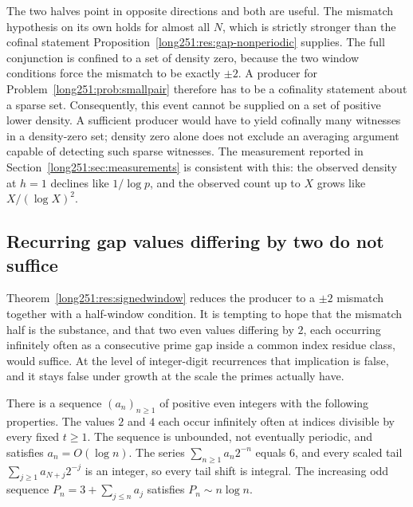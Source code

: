\documentclass[11pt]{article}
\begin{document}
The two halves point in opposite directions and both are useful.  The mismatch
hypothesis on its own holds for almost all $N$, which is strictly stronger than
the cofinal statement Proposition~\ref{long251:res:gap-nonperiodic} supplies.  The full
conjunction is confined to a set of density zero, because the two window
conditions force the mismatch to be exactly $\pm2$.  A producer for
Problem~\ref{long251:prob:smallpair} therefore has to be a cofinality statement about
a sparse set.  Consequently, this event cannot be supplied on a set of positive
lower density.  A sufficient producer would have to yield cofinally many
witnesses in a density-zero set; density zero alone does not exclude an
averaging argument capable of detecting such sparse witnesses.  The measurement reported
in Section~\ref{long251:sec:measurements} is consistent with this: the observed density
at $h=1$ declines like $1/\log p$, and the observed count up to $X$ grows like
$X/(\log X)^2$.

\subsection{Recurring gap values differing by two do not suffice}

Theorem~\ref{long251:res:signedwindow} reduces the producer to a $\pm2$ mismatch
together with a half-window condition.  It is tempting to hope that the
mismatch half is the substance, and that two even values differing by $2$, each
occurring infinitely often as a consecutive prime gap inside a common index
residue class, would suffice.  At the level of integer-digit recurrences that
implication is false, and it stays false under growth at the scale the primes
actually have.

\begin{theorem}\label{long251:res:polignacfail}
There is a sequence $(a_n)_{n\ge1}$ of positive even integers with the
following properties.  The values $2$ and $4$ each occur infinitely often at
indices divisible by every fixed $t\ge1$.  The sequence is unbounded, not
eventually periodic, and satisfies $a_n=O(\log n)$.  The series
$\sum_{n\ge1}a_n2^{-n}$ equals $6$, and every scaled tail
$\sum_{j\ge1}a_{N+j}2^{-j}$ is an integer, so every tail shift is integral.
The increasing odd sequence $P_n=3+\sum_{j\le n}a_j$ satisfies
$P_n\sim n\log n$.
\end{theorem}
\end{document}
